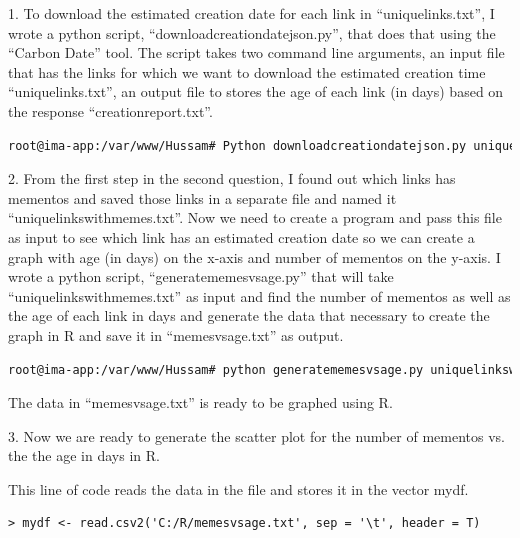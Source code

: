 \documentclass[a4paper, 11pt]{article}
\begin{document}
1. To download the estimated creation date for each link in ``uniquelinks.txt'', I wrote a python script, ``downloadcreationdatejson.py'', that does that using the ``Carbon Date'' tool. The script takes two command line arguments, an input file that has the links for which we want to download the estimated creation time ``uniquelinks.txt'', an output file to stores the age of each link (in days) based on the response ``creationreport.txt''.



\begin{lstlisting}[language=bash, breakatwhitespace=〈false), label=Command, caption=Running downloadcreationdatejson.py]
root@ima-app:/var/www/Hussam# Python downloadcreationdatejson.py uniquelinks.txt creationreport.txt
\end{lstlisting}

2. From the first step in the second question, I found out which links has mementos and saved those links in a separate file and named it ``uniquelinkswithmemes.txt''. Now we need to create a program and pass this file as input to see which link has an estimated creation date so we can create a graph with age (in days) on the x-axis and number of mementos on the y-axis. I wrote a python script, ``generatememesvsage.py'' that will take ``uniquelinkswithmemes.txt'' as input and find the number of mementos as well as the age of each link in days and generate the data that necessary to create the graph in R and save it in ``memesvsage.txt'' as output.



\begin{lstlisting}[language=bash, breakatwhitespace=〈false), label=Command, caption=Running generatememesvsage.py]
root@ima-app:/var/www/Hussam# python generatememesvsage.py uniquelinkswithmemes.txt memesvsage.txt
\end{lstlisting} 

The data in ``memesvsage.txt'' is ready to be graphed using R.

3. Now we are ready to generate the scatter plot for the number of mementos vs. the the age in days in R.

This line of code reads the data in the file and stores it in the vector mydf.
\begin{lstlisting}
> mydf <- read.csv2('C:/R/memesvsage.txt', sep = '\t', header = T)
\end{lstlisting}
\end{document}
